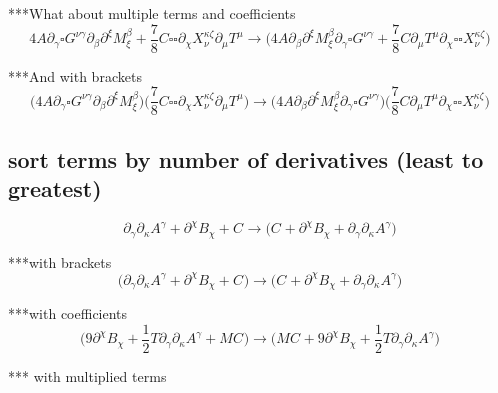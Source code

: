\documentclass{article}
\def\){\Big)}
\def\({\Big(}
\begin{document}
***What about multiple terms and coefficients
\begin{equation}
4A\partial_{\gamma} \square G^{\nu \gamma} \partial_{\beta}\partial^{\xi} M^{\beta}_{\xi} +
  \frac{7}{8} C \square \square \partial_{\chi} X^{\kappa \zeta}_{\nu}  \partial_{\mu}T^{\mu} \rightarrow 
\(4 A \partial_{\beta}\partial^{\xi}M_{\xi}^{\beta} \partial_{\gamma}\square G^{\nu \gamma} +\frac{7}{8} C \partial_{\mu}T^{\mu} \partial_{\chi}\square \square X_{\nu}^{\kappa \zeta} \)
\end{equation}

***And with brackets 
\begin{equation}
\( 4A\partial_{\gamma} \square G^{\nu \gamma} \partial_{\beta}\partial^{\xi} M^{\beta}_{\xi}\)\(
  \frac{7}{8} C \square \square \partial_{\chi} X^{\kappa \zeta}_{\nu}  \partial_{\mu}T^{\mu} \) \rightarrow 
\(4 A \partial_{\beta}\partial^{\xi}M_{\xi}^{\beta} \partial_{\gamma}\square G^{\nu \gamma} \)\(\frac{7}{8} C \partial_{\mu}T^{\mu} \partial_{\chi}\square \square X_{\nu}^{\kappa \zeta} \)
 \end{equation}


 \subsection{sort terms by number of derivatives (least to greatest)}

\begin{equation}
\partial_{\gamma} \partial_{\kappa}A^{\gamma} + \partial^{\chi}B_{\chi} + C^{} \rightarrow 
\( C^{} + \partial^{\chi}B_{\chi} + \partial_{\gamma}\partial_{\kappa}A^{\gamma} \)
\end{equation}

***with brackets
\begin{equation}
\(\partial_{\gamma} \partial_{\kappa}A^{\gamma} + \partial^{\chi}B_{\chi} + C^{}\)  \rightarrow 
\( C^{} + \partial^{\chi}B_{\chi} + \partial_{\gamma}\partial_{\kappa}A^{\gamma} \)
\end{equation}

***with coefficients
\begin{equation}
\(  9\partial^{\chi}B_{\chi} +\frac{1}{2}T \partial_{\gamma}\partial_{\kappa}A^{\gamma} +M C^{} \) \rightarrow 
\(M C^{} +9 \partial^{\chi}B_{\chi} +\frac{1}{2} T \partial_{\gamma}\partial_{\kappa}A^{\gamma} \)
\end{equation}

*** with multiplied terms
\end{document}
